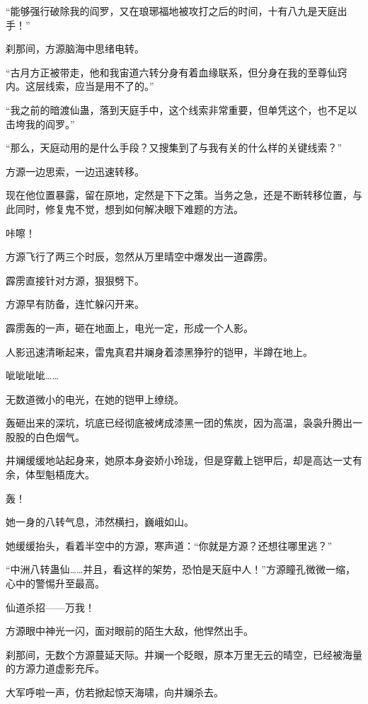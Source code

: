 
\begin{this_body}

“能够强行破除我的阎罗，又在琅琊福地被攻打之后的时间，十有八九是天庭出手！”

刹那间，方源脑海中思绪电转。

“古月方正被带走，他和我宙道六转分身有着血缘联系，但分身在我的至尊仙窍内。这层线索，应当是用不了的。”

“我之前的暗渡仙蛊，落到天庭手中，这个线索非常重要，但单凭这个，也不足以击垮我的阎罗。”

“那么，天庭动用的是什么手段？又搜集到了与我有关的什么样的关键线索？”

方源一边思索，一边迅速转移。

现在他位置暴露，留在原地，定然是下下之策。当务之急，还是不断转移位置，与此同时，修复鬼不觉，想到如何解决眼下难题的方法。

咔嚓！

方源飞行了两三个时辰，忽然从万里晴空中爆发出一道霹雳。

霹雳直接针对方源，狠狠劈下。

方源早有防备，连忙躲闪开来。

霹雳轰的一声，砸在地面上，电光一定，形成一个人影。

人影迅速清晰起来，雷鬼真君井斓身着漆黑狰狞的铠甲，半蹲在地上。

呲呲呲呲……

无数道微小的电光，在她的铠甲上缭绕。

轰砸出来的深坑，坑底已经彻底被烤成漆黑一团的焦炭，因为高温，袅袅升腾出一股股的白色烟气。

井斓缓缓地站起身来，她原本身姿娇小玲珑，但是穿戴上铠甲后，却是高达一丈有余，体型魁梧庞大。

轰！

她一身的八转气息，沛然横扫，巍峨如山。

她缓缓抬头，看着半空中的方源，寒声道：“你就是方源？还想往哪里逃？”

“中洲八转蛊仙……并且，看这样的架势，恐怕是天庭中人！”方源瞳孔微微一缩，心中的警惕升至最高。

仙道杀招——万我！

方源眼中神光一闪，面对眼前的陌生大敌，他悍然出手。

刹那间，无数个方源蔓延天际。井斓一个眨眼，原本万里无云的晴空，已经被海量的方源力道虚影充斥。

大军呼啦一声，仿若掀起惊天海啸，向井斓杀去。


\end{this_body}
